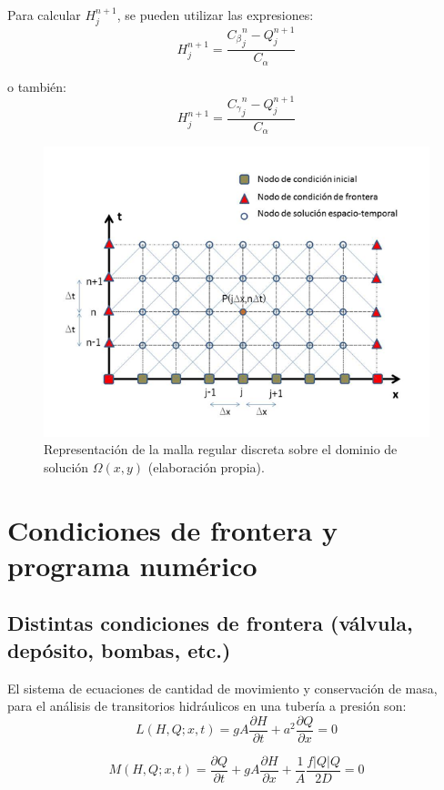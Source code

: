 \documentclass[letterpaper]{report}
\begin{document}
Para calcular $H_j^{n+1}$, se pueden utilizar las expresiones:
\begin{equation}
	H_j^{n+1}=\dfrac{{C_\beta}_j^n-Q_j^{n+1}}{C_\alpha}
\label{eq:qp17}
\end{equation}

o también:
\begin{equation}
	H_j^{n+1}=\frac{{C_\gamma}_j^n-Q_j^{n+1}}{C_\alpha}
\label{eq:qp18}
\end{equation}

\begin{figure}[H]
	\centering
	\includegraphics[width=0.8\linewidth]{figuras/fig24}
	\caption{Representación de la malla regular discreta sobre el dominio de solución $\Omega(x,y)$ (elaboración propia).}
	\label{fig:fig24}
\end{figure}

\section{Condiciones de frontera y programa numérico}
\subsection{Distintas condiciones de frontera (válvula, depósito, bombas, etc.)}
El sistema de ecuaciones de cantidad de movimiento y conservación de masa, para el análisis de transitorios hidráulicos en una tubería a presión son:
\begin{equation}
	L(H,Q;x,t)=gA\dfrac{\partial H}{\partial t}+a^2\dfrac{\partial Q}{\partial x}=0
\label{eq:qp19}
\end{equation}

\begin{equation}
	M(H,Q;x,t)=\dfrac{\partial Q}{\partial t}+gA\dfrac{\partial H}{\partial x}+\dfrac{1}{A}\dfrac{f|Q|Q}{2D}=0
\label{eq:qp20}
\end{equation}
\end{document}
